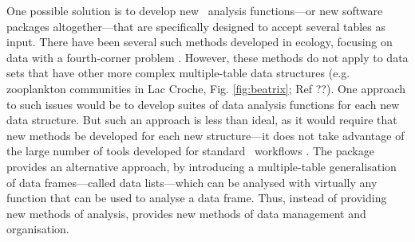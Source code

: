 \documentclass[a4paper]{report}
\numberwithin{exercise}{section}
\begin{document}
\begin{article}
One possible solution is to develop new \R\ analysis functions---or new software packages altogether---that are specifically designed to accept several tables as input.  There have been several such methods developed in ecology, focusing on data with a fourth-corner problem \citep{DoledecEtAl1996,LegendreEtAl1997,DrayAndLegendre2008,PillarEtAl2010,LeiboldEtAl2010,IvesAndHelmus2011}.  However, these methods do not apply to data sets that have other more complex multiple-table data structures (e.g. zooplankton communities in Lac Croche, Fig. \ref{fig:beatrix}; Ref ??).  One approach to such issues would be to develop suites of data analysis functions for each new data structure.  But such an approach is less than ideal, as it would require that new methods be developed for each new structure---it does not take advantage of the large number of tools developed for standard \R\ workflows \citep{ChambersAndHastie1992}.  The  package provides an alternative approach, by introducing a multiple-table generalisation of data frames---called data lists---which can be analysed with virtually any function that can be used to analyse a data frame.  Thus, instead of providing new methods of analysis,  provides new methods of data management and organisation.


\end{article}
\end{document}
